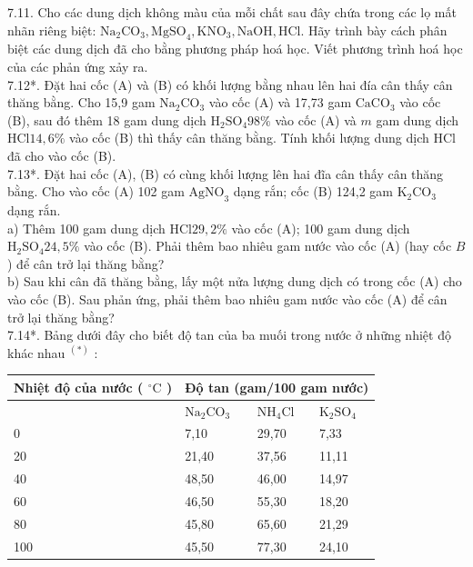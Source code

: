 \documentclass[10pt]{article}
\begin{document}
7.11. Cho các dung dịch không màu của mỗi chất sau đây chứa trong các lọ mất nhãn riêng biệt: $\mathrm{Na}_{2} \mathrm{CO}_{3}, \mathrm{MgSO}_{4}, \mathrm{KNO}_{3}, \mathrm{NaOH}, \mathrm{HCl}$. Hãy trình bày cách phân biệt các dung dịch đã cho bằng phương pháp hoá học. Viết phương trình hoá học của các phản ứng xảy ra.\\
7.12*. Đặt hai cốc (A) và (B) có khối lượng bằng nhau lên hai đía cân thấy cân thăng bằng. Cho 15,9 gam $\mathrm{Na}_{2} \mathrm{CO}_{3}$ vào cốc (A) và 17,73 gam $\mathrm{CaCO}_{3}$ vào cốc (B), sau đó thêm 18 gam dung dịch $\mathrm{H}_{2} \mathrm{SO}_{4} 98 \%$ vào cốc (A) và $m$ gam dung dịch $\mathrm{HCl} 14,6 \%$ vào cốc (B) thì thấy cân thăng bằng. Tính khối lượng dung dịch HCl đã cho vào cốc (B).\\
7.13*. Đặt hai cốc (A), (B) có cùng khối lượng lên hai đĩa cân thấy cân thăng bằng. Cho vào cốc (A) 102 gam $\mathrm{AgNO}_{3}$ dạng rắn; cốc (B) 124,2 gam $\mathrm{K}_{2} \mathrm{CO}_{3}$ dạng rắn.\\
a) Thêm 100 gam dung dịch $\mathrm{HCl} 29,2 \%$ vào cốc (A); 100 gam dung dịch $\mathrm{H}_{2} \mathrm{SO}_{4} 24,5 \%$ vào cốc (B). Phải thêm bao nhiêu gam nước vào cốc (A) (hay cốc $B$ ) để cân trở lại thăng bằng?\\
b) Sau khi cân đã thăng bằng, lấy một nửa lượng dung dịch có trong cốc (A) cho vào cốc (B). Sau phản ứng, phải thêm bao nhiêu gam nước vào cốc (A) để cân trở lại thăng bằng?\\
7.14*. Bảng dưới đây cho biết độ tan của ba muối trong nước ở những nhiệt độ khác nhau ${ }^{(*)}$ :

\begin{center}
\begin{tabular}{|l|l|l|l|}
\hline
\multirow{2}{*}{Nhiệt độ của nước ( ${ }^{\circ} \mathrm{C}$ )} & \multicolumn{3}{|c|}{Độ tan (gam/100 gam nước)} \\
\hline
 & $\mathrm{Na}_{2} \mathrm{CO}_{3}$ & $\mathrm{NH}_{4} \mathrm{Cl}$ & $\mathrm{K}_{2} \mathrm{SO}_{4}$ \\
\hline
0 & 7,10 & 29,70 & 7,33 \\
\hline
20 & 21,40 & 37,56 & 11,11 \\
\hline
40 & 48,50 & 46,00 & 14,97 \\
\hline
60 & 46,50 & 55,30 & 18,20 \\
\hline
80 & 45,80 & 65,60 & 21,29 \\
\hline
100 & 45,50 & 77,30 & 24,10 \\
\hline
\end{tabular}
\end{center}
\end{document}
